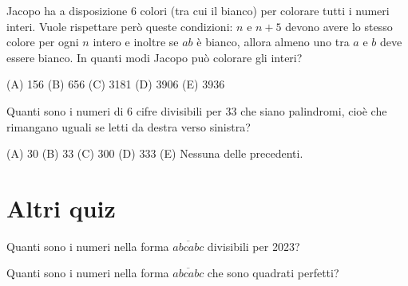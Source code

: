 \begin{esercizio}
    \label{ex:distrettuali_2019}
    Jacopo ha a disposizione 6 colori (tra cui il bianco) per colorare tutti i numeri interi.
    Vuole rispettare però queste condizioni: $n$ e $n + 5$ devono avere lo stesso colore per ogni $n$ intero e
    inoltre se $ab$ è bianco, allora almeno uno tra $a$ e $b$ deve essere bianco.
    In quanti modi Jacopo può colorare gli interi?

    (A) 156 \quad (B) 656 \quad (C) 3181 \quad (D) 3906 \quad (E) 3936
\end{esercizio}

\begin{esercizio}
    \label{ex:distrettuali_2021}
    Quanti sono i numeri di 6 cifre divisibili per 33 che siano palindromi, cioè che rimangano uguali
    se letti da destra verso sinistra?

    (A) 30 \quad (B) 33 \quad (C) 300 \quad (D) 333 \quad (E) Nessuna delle precedenti.
\end{esercizio}

\section{Altri quiz}
\label{sec:quiz_altri}

\begin{esercizio}
    \label{ex:francesco_1}
    Quanti sono i numeri nella forma $\overline{abcabc}$ divisibili per 2023?
\end{esercizio}

\begin{esercizio}
    \label{ex:francesco_2}
    Quanti sono i numeri nella forma $\overline{abcabc}$ che sono quadrati perfetti?
\end{esercizio}
